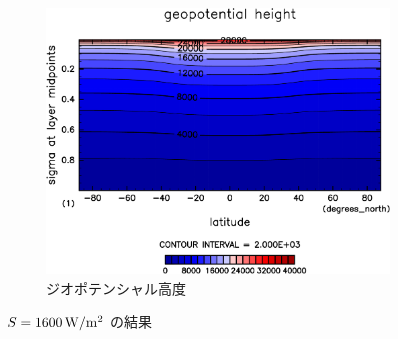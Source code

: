 \documentclass[body]{subfiles}
\begin{document}
\begin{figure}[t]
\begin{subfigure}{.4\textwidth}
		\includegraphics[width=\columnwidth]{S1600/Height,time=3650:4015-crop-rotate.pdf}
		\caption{ジオポテンシャル高度}
	\end{subfigure}
	\caption{
		\(S=1600\hmu{W/m^2}\) の結果
	}
\end{figure}
\end{document}
